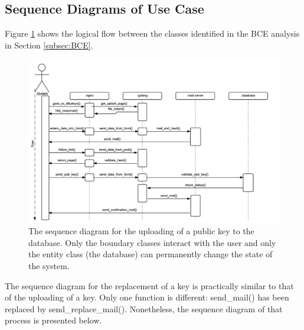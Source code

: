 \documentclass[11pt,a4paper]{report}
\begin{document}



\subsection{Sequence Diagrams of Use Case}\label{subsec:Sequence_diagram_Use_case_model}
Figure \ref{fig:sequence_diagram} shows the logical flow between the classes identified in the BCE analysis in Section \ref{subsec:BCE}.
\begin{figure}[H]
    \centering
    \includegraphics[width=1.2\textwidth]{pictures/sequence_diagram_upload_key_test}
    \caption{The sequence diagram for the uploading of a public key to the database. Only the boundary classes interact with the user and only the entity class (the database) can permanently change the state of the system.}
    \label{fig:sequence_diagram}
\end{figure}

The sequence diagram for the replacement of a key is practically similar to that of the uploading of a key. Only one function is different: send\_mail() has been replaced by send\_replace\_mail(). Nonetheless, the sequence diagram of that process is presented below.
\end{document}
